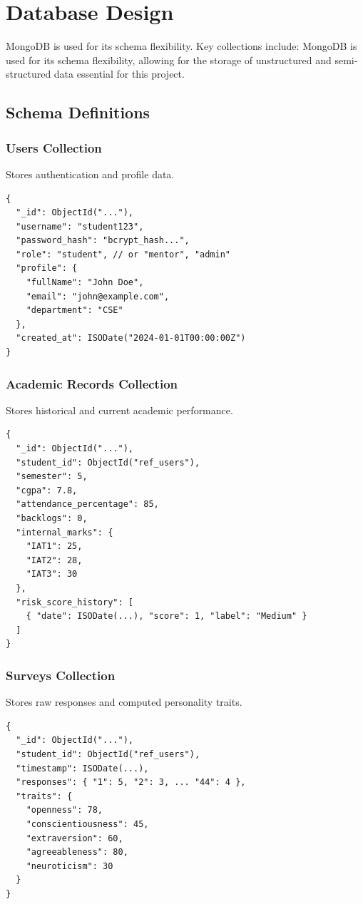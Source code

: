 \documentclass[12pt,a4paper]{report}
\begin{document}
\section{Database Design}

MongoDB is used for its schema flexibility. Key collections include:
MongoDB is used for its schema flexibility, allowing for the storage of unstructured and semi-structured data essential for this project.

\subsection{Schema Definitions}

\subsubsection{Users Collection}
Stores authentication and profile data.
\begin{verbatim}
{
  "_id": ObjectId("..."),
  "username": "student123",
  "password_hash": "bcrypt_hash...",
  "role": "student", // or "mentor", "admin"
  "profile": {
    "fullName": "John Doe",
    "email": "john@example.com",
    "department": "CSE"
  },
  "created_at": ISODate("2024-01-01T00:00:00Z")
}
\end{verbatim}

\subsubsection{Academic Records Collection}
Stores historical and current academic performance.
\begin{verbatim}
{
  "_id": ObjectId("..."),
  "student_id": ObjectId("ref_users"),
  "semester": 5,
  "cgpa": 7.8,
  "attendance_percentage": 85,
  "backlogs": 0,
  "internal_marks": {
    "IAT1": 25,
    "IAT2": 28,
    "IAT3": 30
  },
  "risk_score_history": [
    { "date": ISODate(...), "score": 1, "label": "Medium" }
  ]
}
\end{verbatim}

\subsubsection{Surveys Collection}
Stores raw responses and computed personality traits.
\begin{verbatim}
{
  "_id": ObjectId("..."),
  "student_id": ObjectId("ref_users"),
  "timestamp": ISODate(...),
  "responses": { "1": 5, "2": 3, ... "44": 4 },
  "traits": {
    "openness": 78,
    "conscientiousness": 45,
    "extraversion": 60,
    "agreeableness": 80,
    "neuroticism": 30
  }
}
\end{verbatim}
\end{document}
